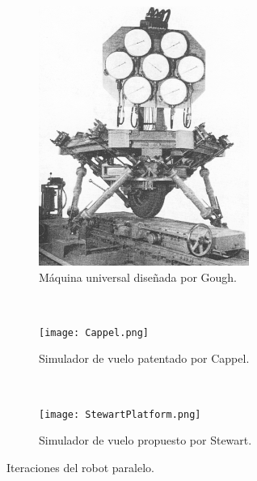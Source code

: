 \begin{figure}[hb!]
    \centering
    \begin{subfigure}[b]{0.3\textwidth}
        \includegraphics[width=\textwidth]{03_Reporte/img/GoughPlatform.png}
        \caption{Máquina universal diseñada por Gough. \cite{stewart}}
        \label{fig: gough robot}
    \end{subfigure}
    ~ %
    \begin{subfigure}[b]{0.3\textwidth}
         \texttt{[image: Cappel.png]}
        \caption{Simulador de vuelo patentado por Cappel. \cite{cappel}}
        \label{fig: cappel robot}
    \end{subfigure}
    ~ %
    \begin{subfigure}[b]{0.3\textwidth}
        \texttt{[image: StewartPlatform.png]}
        \caption{Simulador de vuelo propuesto por Stewart. \cite{stewart}}
        \label{fig: stewart robot}
    \end{subfigure}
    \caption{Iteraciones del robot paralelo.}\label{fig: parallel robots}
\end{figure}

